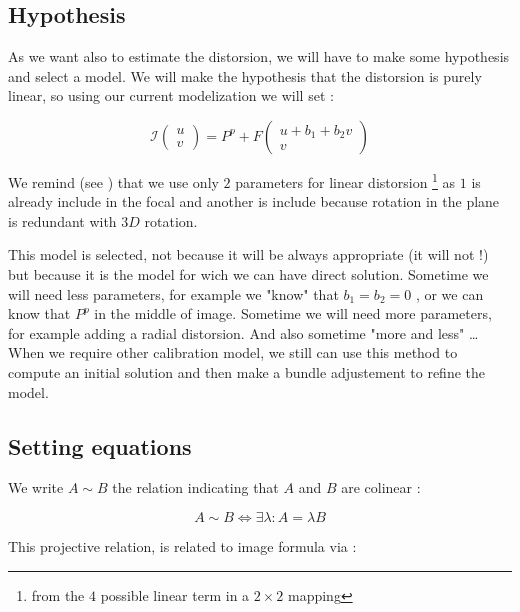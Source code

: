 \subsection{Hypothesis}

As we want also to estimate the distorsion, we will have to make some hypothesis
and select a model.  We will make the hypothesis that the distorsion is purely linear, so using
our current modelization we will set :

\begin{equation}
	\mathcal{I}  \begin{pmatrix} u \\ v \end{pmatrix}  = P^p + F \begin{pmatrix} u + b_1 + b_2 v \\ v \end{pmatrix} 
\end{equation}

We remind (see \RefFantome) that we use  only $2$ parameters for linear distorsion 
\footnote {from the $4$ possible linear term in a $2 \times 2$ mapping}
 as $1$ is already include in the focal and another is include
because rotation in the plane is redundant with $3D$ rotation. 

This model is selected, not because it will be always appropriate (it will not !) but because
it is the model  for wich we can have direct solution. Sometime we will need less parameters,
for example we "know" that $b_1=b_2=0$ , or we can  know that $P^p$ in the middle of image. Sometime
we will need more parameters, for example adding a radial distorsion. And also sometime
"more and less" \dots When we require other calibration model, we still can use this method to compute
an initial solution and then make a bundle adjustement to refine the model.


\subsection{Setting equations}

We write $A \sim B$ the relation indicating that $A$ and $B$ are colinear :

\begin{equation}
	  A \sim B   \Leftrightarrow  \exists \lambda : A =  \lambda B
\end{equation}

This projective relation, is related to image formula via :

